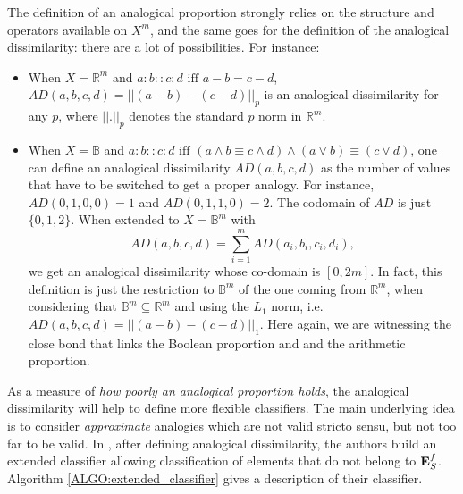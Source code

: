 The definition of an analogical proportion strongly relies on the structure and
operators available on $X^m$, and the same goes for the definition of the
analogical dissimilarity: there are a lot of possibilities. For instance:
\begin{itemize}
\item When $X=\mathbb{R}^m$ and $a:b::c:d \mbox{ iff } a-b=c-d$, $AD(a,b,c,d) =
  ||(a-b)-(c-d)||_p$ is an analogical dissimilarity for any $p$,
  where $||.||_p$ denotes the standard $p$ norm  in $\mathbb{R}^m$.
\item
When $X=\mathbb{B}$ and $a:b::c:d \mbox{ iff } (a \wedge b \equiv c
  \wedge d) \wedge (a \vee  b) \equiv (c \vee d)$, one can define an analogical
  dissimilarity $AD(a,b,c,d)$ as the number of values that have to be switched
  to get a proper analogy. For instance, $AD(0,1,0,0)=1$ and $AD(0,1,1,0)=2$.
The codomain of $AD$ is just $\{0, 1, 2\}$. When extended to
  $X=\mathbb{B}^m$ with $$AD(a,b,c,d) = \sum\limits_{i=1}^m AD(a_i,b_i,c_i,d_i),$$
  we get an analogical dissimilarity whose co-domain is $[0, 2m]$. In fact,
  this definition is just the restriction to $\mathbb{B}^m$ of the one coming
  from $\mathbb{R}^m$, when considering that $\mathbb{B}^m \subseteq
  \mathbb{R}^m$ and using the $L_1$ norm, i.e. $AD(a,b,c,d) =
    ||(a-b)-(c-d)||_1$. Here again, we are witnessing the close bond that links
    the Boolean proportion and and the arithmetic proportion.
\end{itemize}

As a measure of \textit{how poorly an analogical proportion holds}, the
analogical dissimilarity will help to define more flexible classifiers.  The
main underlying idea is to consider {\it approximate} analogies which are not
valid stricto sensu, but not too far to be valid.
In \cite{BayMicDelIJCAI07}, after defining analogical dissimilarity,  the authors
build an extended classifier allowing classification of elements that do not
belong to $\mathbf{E}_{S}^{f}$. Algorithm \ref{ALGO:extended_classifier} gives a
description of their classifier.

